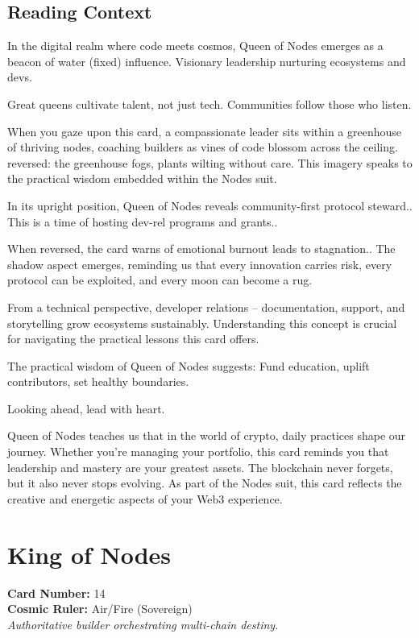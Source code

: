 \documentclass[11pt,oneside]{book}
\begin{document}
\begin{minipage}[t]{0.55\textwidth}
  \subsection*{Reading Context}
  In the digital realm where code meets cosmos, Queen of Nodes emerges as a beacon of water (fixed) influence. Visionary leadership nurturing ecosystems and devs.

  Great queens cultivate talent, not just tech. Communities follow those who listen.

  When you gaze upon this card, a compassionate leader sits within a greenhouse of thriving nodes, coaching builders as vines of code blossom across the ceiling. reversed: the greenhouse fogs, plants wilting without care. This imagery speaks to the practical wisdom embedded within the Nodes suit.

  In its upright position, Queen of Nodes reveals community-first protocol steward.. This is a time of hosting dev-rel programs and grants..

  When reversed, the card warns of emotional burnout leads to stagnation.. The shadow aspect emerges, reminding us that every innovation carries risk, every protocol can be exploited, and every moon can become a rug.

  From a technical perspective, developer relations – documentation, support, and storytelling grow ecosystems sustainably. Understanding this concept is crucial for navigating the practical lessons this card offers.

  The practical wisdom of Queen of Nodes suggests: Fund education, uplift contributors, set healthy boundaries.

  Looking ahead, lead with heart.

  Queen of Nodes teaches us that in the world of crypto, daily practices shape our journey. Whether you're managing your portfolio, this card reminds you that leadership and mastery are your greatest assets. The blockchain never forgets, but it also never stops evolving. As part of the Nodes suit, this card reflects the creative and energetic aspects of your Web3 experience.

\end{minipage}

\newpage
\section*{King of Nodes}

\begin{minipage}[t]{0.55\textwidth}
  \vspace{0pt}
  \textbf{Card Number:} 14\\  \textbf{Cosmic Ruler:} Air/Fire (Sovereign)\\  \textit{Authoritative builder orchestrating multi-chain destiny.}
\end{minipage}
\end{document}
